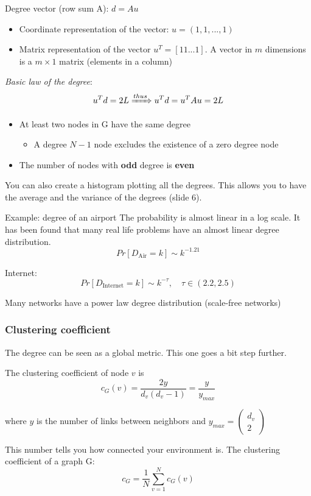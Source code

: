 Degree vector (row sum A): $d = Au$
\begin{itemize}
  \item Coordinate representation of the vector: $u = (1, 1, ..., 1)$
  \item Matrix representation of the vector $u^T = [1 1 ... 1]$. A vector in $m$ dimensions is
  a $m \times 1$ matrix (elements in a column)
\end{itemize}

\emph{Basic law of the degree}:
$$
u^T d = 2L \xRightarrow{thus} u^Td = u^T Au = 2L
$$

\begin{itemize}
  \item At least two nodes in G have the same degree
  \begin{itemize}
    \item A degree $N-1$ node excludes the existence of a zero degree node
  \end{itemize}
  \item The number of nodes with \textbf{odd} degree is \textbf{even}
\end{itemize}

You can also create a histogram plotting all the degrees. This allows you to have the average
and the variance of the degrees (slide 6).

Example: degree of an airport
The probability is almost linear in a log scale. It has been found that many real life problems
have an almost linear degree distribution.
$$
Pr[D_{\text{Air}} = k] \sim k^{-1.21}
$$

Internet:
$$
Pr[D_{\text{Internet}} = k] \sim k^{-\tau}, \quad \tau \in (2.2, 2.5)
$$

Many networks have a power law degree distribution (scale-free networks)

\subsubsection{Clustering coefficient}
The degree can be seen as a global metric. This one goes a bit step further.

The clustering coefficient of node $v$ is 
$$
c_G(v) = \frac{2y}{d_v(d_v - 1)} = \frac{y}{y_{max}}
$$

where $y$ is the number of links between neighbors and 
$
y_{max} = \begin{pmatrix}
  d_v \\ 2
\end{pmatrix}
$

This number tells you how connected your environment is. The clustering coefficient of a graph G:
$$
c_G = \frac{1}{N} \sum_{v = 1}^N c_G(v)
$$

